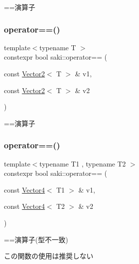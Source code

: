 ==演算子 

\mbox{\label{namespacesaki_aebe3f4c69f62ec8edc68723c5194c3b9}} 
\subsubsection{\texorpdfstring{operator==()}{operator==()}\hspace{0.1cm}{\footnotesize\ttfamily [6/11]}}
{\footnotesize\ttfamily template$<$typename T $>$ \\
constexpr bool saki\+::operator== (\begin{DoxyParamCaption}\item[{const \mbox{\hyperlink{classsaki_1_1_vector2}{Vector2}}$<$ T $>$ \&}]{v1,  }\item[{const \mbox{\hyperlink{classsaki_1_1_vector2}{Vector2}}$<$ T $>$ \&}]{v2 }\end{DoxyParamCaption})}



==演算子 

\mbox{\label{namespacesaki_a3c0f3a38ce313956032cd123f702b7a5}} 
\subsubsection{\texorpdfstring{operator==()}{operator==()}\hspace{0.1cm}{\footnotesize\ttfamily [7/11]}}
{\footnotesize\ttfamily template$<$typename T1 , typename T2 $>$ \\
constexpr bool saki\+::operator== (\begin{DoxyParamCaption}\item[{const \mbox{\hyperlink{classsaki_1_1_vector4}{Vector4}}$<$ T1 $>$ \&}]{v1,  }\item[{const \mbox{\hyperlink{classsaki_1_1_vector4}{Vector4}}$<$ T2 $>$ \&}]{v2 }\end{DoxyParamCaption})}



==演算子(型不一致) 

この関数の使用は推奨しない \mbox{\label{namespacesaki_a487f0b513be6d4a0aecafeec28b6fc69}} 
